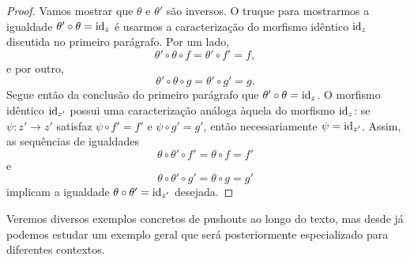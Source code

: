 \begin{proof}
    Vamos mostrar que $\theta$ e $\theta'$ são inversos.
    O truque para mostrarmos a igualdade $\theta' \circ \theta = \mathrm{id}_z$ é usarmos a caracterização do morfismo idêntico $\mathrm{id}_z$ discutida no primeiro parágrafo.
    Por um lado,
    \begin{displaymath}
        \theta' \circ \theta \circ f
        = \theta' \circ f' = f,
    \end{displaymath}
    e por outro,
    \begin{displaymath}
        \theta' \circ \theta \circ g
        = \theta' \circ g'
        = g.
    \end{displaymath}
    Segue então da conclusão do primeiro parágrafo que $\theta' \circ \theta = \mathrm{id}_z$.
    O morfismo idêntico $\mathrm{id}_{z'}$ possui uma caracterização análoga àquela do morfismo $\mathrm{id}_z$: se $\psi: z' \to z'$ satisfaz $\psi \circ f' = f'$ e $\psi \circ g' = g'$, então necessariamente $\psi = \mathrm{id}_{z'}$.
    Assim, as sequências de igualdades
    \begin{displaymath}
        \theta \circ \theta' \circ f'
        = \theta \circ f
        = f'
    \end{displaymath}
    e
    \begin{displaymath}
        \theta \circ \theta' \circ g'
        = \theta \circ g
        = g'
    \end{displaymath}
    implicam a igualdade $\theta \circ \theta' = \mathrm{id}_{z'}$ desejada.
\end{proof}

Veremos diversos exemplos concretos de pushouts ao longo do texto, mas desde já podemos estudar um exemplo geral que será posteriormente especializado para diferentes contextos.

